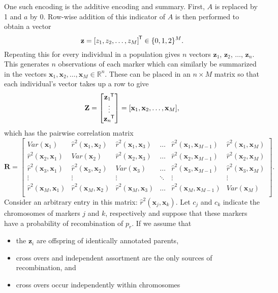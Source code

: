 \documentclass{article}
\newcommand{\ve}[1]{\mathbf{#1}}           %
\newcommand{\m}[1]{\mathbf{#1}}               %
\newcommand{\tr}[1]{{#1}^{\mkern-1.5mu\mathsf{T}}}              %
\newcommand{\obscorr}{\widehat{r}^2}
\newcommand{\field}[1]{\mathbb{#1}}
\newcommand{\Reals}{\field{R}}
\begin{document}
One such encoding is the additive encoding and summary. First, $A$ is replaced by 1 and $a$ by 0. Row-wise addition of this indicator of $A$ is then performed to obtain a vector
$$\ve{z} = \tr{[z_1, z_2, \dots, z_M]} \in \{0,1,2\}^M.$$
Repeating this for every individual in a population gives $n$ vectors $\ve{z}_1$, $\ve{z}_2$, $\dots$, $\ve{z}_n$. This generates $n$ observations of each marker which can similarly be summarized in the vectors $\ve{x}_1, \ve{x}_2, \dots, \ve{x}_M \in \Reals^n$. These can be placed in an $n \times M$ matrix so that each individual's vector takes up a row to give
$$\m{Z} = \begin{bmatrix}
  \tr{\ve{z}_1} \\
  \vdots \\
  \tr{\ve{z}_n}
\end{bmatrix} = [\ve{x}_1, \ve{x}_2, \dots, \ve{x}_M],$$
which has the pairwise correlation matrix
$$\m{R} = \begin{bmatrix}
  Var(\ve{x}_1) & \obscorr(\ve{x}_1, \ve{x}_2) & \obscorr(\ve{x}_1, \ve{x}_3) & \dots & \obscorr(\ve{x}_1, \ve{x}_{M-1}) & \obscorr(\ve{x}_1, \ve{x}_M) \\
  \obscorr(\ve{x}_2, \ve{x}_1) & Var(\ve{x}_2) & \obscorr(\ve{x}_2, \ve{x}_3) & \dots & \obscorr(\ve{x}_2, \ve{x}_{M-1}) & \obscorr(\ve{x}_2, \ve{x}_M) \\
  \obscorr(\ve{x}_3, \ve{x}_1) & \obscorr(\ve{x}_3, \ve{x}_2) & Var(\ve{x}_3) & \dots & \obscorr(\ve{x}_3, \ve{x}_{M-1}) & \obscorr(\ve{x}_3, \ve{x}_M) \\
  \vdots & \vdots & \vdots & \ddots & \vdots & \vdots \\
  \obscorr(\ve{x}_M, \ve{x}_1) & \obscorr(\ve{x}_M, \ve{x}_2) & \obscorr(\ve{x}_M, \ve{x}_3) & \dots & \obscorr(\ve{x}_M, \ve{x}_{M-1}) & Var(\ve{x}_M) \\
\end{bmatrix}.$$
Consider an arbitrary entry in this matrix: $\obscorr(\ve{x}_j, \ve{x}_k)$. Let $c_j$ and $c_k$ indicate the chromosomes of markers $j$ and $k$, respectively and suppose that these markers have a probability of recombination of $p_r$. If we assume that
\begin{itemize}
\item the $\ve{z}_i$ are offspring of identically annotated parents,
\item cross overs and independent assortment are the only sources of recombination, and
\item cross overs occur independently within chromosomes
\end{itemize}
\end{document}
